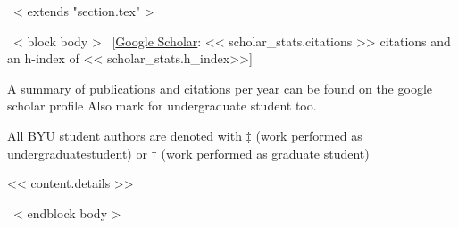 ~< extends "section.tex" >~

~< block body >~
\vspace{-8.2mm}\hspace{30mm}[\href{https://scholar.google.com/citations?user=<< scholar_id >>}{Google Scholar}: << scholar_stats.citations >> citations and an h-index of << scholar_stats.h_index>>]\vspace{3mm}


A summary of publications and citations per year can be found on the google scholar profile
Also mark for undergraduate student too. 


\setlength\fboxsep{2pt}
All BYU student authors are denoted with ‡ (work performed as undergraduatestudent) or † (work performed as graduate student)



<< content.details >>

~< endblock body >~
